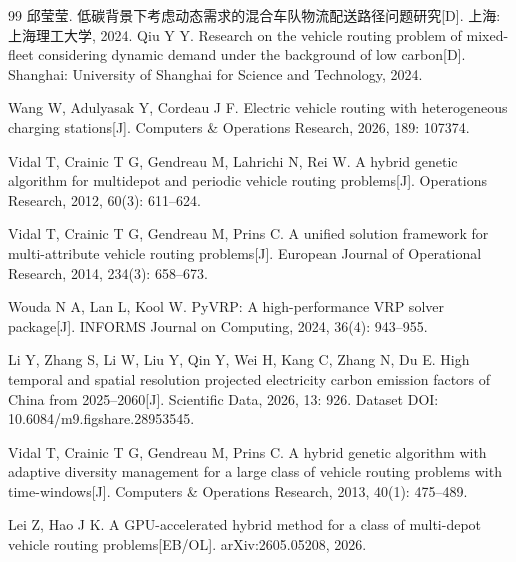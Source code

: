 \documentclass{setp-new}
\begin{document}
\begin{thebibliography}{99}
 邱莹莹. 低碳背景下考虑动态需求的混合车队物流配送路径问题研究[D]. 上海: 上海理工大学, 2024.\newline
Qiu Y Y. Research on the vehicle routing problem of mixed-fleet considering dynamic demand under the background of low carbon[D]. Shanghai: University of Shanghai for Science and Technology, 2024.


 Wang W, Adulyasak Y, Cordeau J F. Electric vehicle routing with heterogeneous charging stations[J]. Computers \& Operations Research, 2026, 189: 107374.

 Vidal T, Crainic T G, Gendreau M, Lahrichi N, Rei W. A hybrid genetic algorithm for multidepot and periodic vehicle routing problems[J]. Operations Research, 2012, 60(3): 611--624.


 Vidal T, Crainic T G, Gendreau M, Prins C. A unified solution framework for multi-attribute vehicle routing problems[J]. European Journal of Operational Research, 2014, 234(3): 658--673.


 Wouda N A, Lan L, Kool W. PyVRP: A high-performance VRP solver package[J]. INFORMS Journal on Computing, 2024, 36(4): 943--955.


 Li Y, Zhang S, Li W, Liu Y, Qin Y, Wei H, Kang C, Zhang N, Du E. High temporal and spatial resolution projected electricity carbon emission factors of China from 2025--2060[J]. Scientific Data, 2026, 13: 926. Dataset DOI: 10.6084/m9.figshare.28953545.


 Vidal T, Crainic T G, Gendreau M, Prins C. A hybrid genetic algorithm with adaptive diversity management for a large class of vehicle routing problems with time-windows[J]. Computers \& Operations Research, 2013, 40(1): 475--489.


 Lei Z, Hao J K. A GPU-accelerated hybrid method for a class of multi-depot vehicle routing problems[EB/OL]. arXiv:2605.05208, 2026.


\end{thebibliography}
\end{document}
